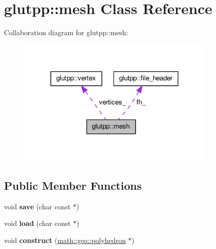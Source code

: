 \hypertarget{classglutpp_1_1mesh}{\section{glutpp\-:\-:mesh \-Class \-Reference}
\label{classglutpp_1_1mesh}
}


\-Collaboration diagram for glutpp\-:\-:mesh\-:\nopagebreak
\begin{figure}[H]
\begin{center}
\leavevmode
\includegraphics[width=270pt]{classglutpp_1_1mesh__coll__graph}
\end{center}
\end{figure}
\subsection*{\-Public \-Member \-Functions}
\begin{DoxyCompactItemize}
\item 
\hypertarget{classglutpp_1_1mesh_a80555f3c7fe096015bbd3349742372cf}{void {\bfseries save} (char const $\ast$)}\label{classglutpp_1_1mesh_a80555f3c7fe096015bbd3349742372cf}

\item 
\hypertarget{classglutpp_1_1mesh_a15e84ee2548fc25bf38bf170d9ef1473}{void {\bfseries load} (char const $\ast$)}\label{classglutpp_1_1mesh_a15e84ee2548fc25bf38bf170d9ef1473}

\item 
\hypertarget{classglutpp_1_1mesh_a38ac06e9bf9628f098a1c59467163abc}{void {\bfseries construct} (\hyperlink{classmath_1_1geo_1_1polyhedron}{math\-::geo\-::polyhedron} $\ast$)}\label{classglutpp_1_1mesh_a38ac06e9bf9628f098a1c59467163abc}

\end{DoxyCompactItemize}
